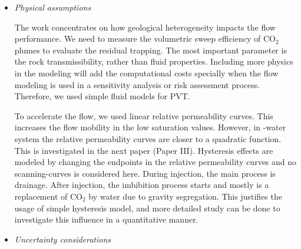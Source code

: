 {\begin{itemize}
This paper is presented in ECMOR conference in Oxford, 2010. This is a
complementary to proceedings works presented in ACM Edinburgh, 2009 and CMWR in
Barcelona, 2010. 

Topography is a major player in the gravity dominated flow behavior. The SAIGUP
realizations include variability in topography of the geological layering via
structural changes due to faults and also barriers in the model. These are good
enough for early migration when the $\mbox{CO}_2$ and water segregate and plumes
accumulate below cap-rock and start the longer migration. In the long-term
migration, top surface geometry is an important geological parameter and
larger models than the SAIGUP models with a better resolution of the top surface
are needed to get good predictions of the long-term migration phase. This
was considered in the next generation of geological studies performed following
this study \cite{syversveenstudy,nilsen2012impact} under the IGEMS research
project.

\item \textit{Physical assumptions}
 
The work concentrates on how geological heterogeneity impacts the flow
performance. We need to measure the volumetric sweep efficiency of $\mbox{CO}_2$
plumes to evaluate the residual trapping. The most important parameter
is the rock transmissibility, rather than fluid properties. Including more
physics in the modeling will add the computational costs specially when the flow
modeling is used in a sensitivity analysis or risk assessment process.
Therefore, we used simple fluid models for PVT. 

To accelerate the flow, we used linear relative permeability curves. This
increases the flow mobility in the low saturation values. However, in \coo-water system the relative permeability curves are closer to a quadratic function. This is investigated in the next paper (Paper III). Hysteresis effects are
modeled by changing the endpoints in the relative permeability curves and no
scanning-curves is considered here. During injection, the main process is
drainage. After injection, the imbibition process starts and mostly is a
replacement of $\mbox{CO}_2$ by water due to gravity segregation. This justifies
the usage of simple hysteresis model, and more detailed study can be done to
investigate this influence in a quantitative manner. 

\item \textit{Uncertainty considerations}


\end{itemize}}
